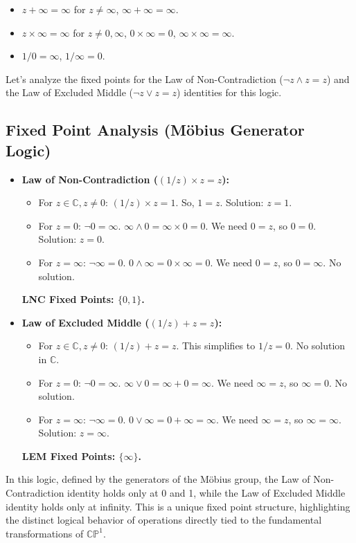 	\begin{itemize}
		\item $z + \infty = \infty$ for $z \neq \infty$, $\infty + \infty = \infty$.
		\item $z \times \infty = \infty$ for $z \neq 0, \infty$, $0 \times \infty = 0$, $\infty \times \infty = \infty$.
		\item $1/0 = \infty$, $1/\infty = 0$.
	\end{itemize}
	Let's analyze the fixed points for the Law of Non-Contradiction ($\neg z \wedge z = z$) and the Law of Excluded Middle ($\neg z \vee z = z$) identities for this logic.
	
	\subsection{Fixed Point Analysis (M\"{o}bius Generator Logic)}
	
	\begin{itemize}
		\item \textbf{Law of Non-Contradiction ($(1/z) \times z = z$):}
		\begin{itemize}
			\item For $z \in \mathbb{C}, z \neq 0$: $(1/z) \times z = 1$. So, $1 = z$. Solution: $z=1$.
			\item For $z = 0$: $\neg 0 = \infty$. $\infty \wedge 0 = \infty \times 0 = 0$. We need $0 = z$, so $0 = 0$. Solution: $z=0$.
			\item For $z = \infty$: $\neg \infty = 0$. $0 \wedge \infty = 0 \times \infty = 0$. We need $0 = z$, so $0 = \infty$. No solution.
		\end{itemize}
		\textbf{LNC Fixed Points: $\{0, 1\}$.}
		
		\item \textbf{Law of Excluded Middle ($(1/z) + z = z$):}
		\begin{itemize}
			\item For $z \in \mathbb{C}, z \neq 0$: $(1/z) + z = z$. This simplifies to $1/z = 0$. No solution in $\mathbb{C}$.
			\item For $z = 0$: $\neg 0 = \infty$. $\infty \vee 0 = \infty + 0 = \infty$. We need $\infty = z$, so $\infty = 0$. No solution.
			\item For $z = \infty$: $\neg \infty = 0$. $0 \vee \infty = 0 + \infty = \infty$. We need $\infty = z$, so $\infty = \infty$. Solution: $z=\infty$.
		\end{itemize}
		\textbf{LEM Fixed Points: $\{\infty\}$.}
	\end{itemize}
	In this logic, defined by the generators of the M\"{o}bius group, the Law of Non-Contradiction identity holds only at 0 and 1, while the Law of Excluded Middle identity holds only at infinity. This is a unique fixed point structure, highlighting the distinct logical behavior of operations directly tied to the fundamental transformations of $\mathbb{CP}^1$.
	
